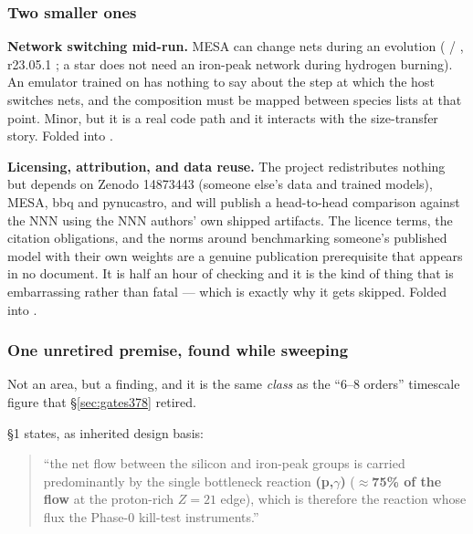 \subsubsection{Two smaller ones}
\label{sec:twosmaller}

\textbf{Network switching mid-run.} MESA can change nets during an evolution
(  / , r23.05.1
; a star does not need an iron-peak network during
hydrogen burning). An emulator trained on  has nothing to say about the
step at which the host switches nets, and the composition must be mapped between
species lists at that point. Minor, but it is a real code path and it interacts
with the size-transfer story. Folded into .

\textbf{Licensing, attribution, and data reuse.} The project redistributes
nothing but depends on Zenodo 14873443 (someone else's data and trained models),
MESA, bbq and pynucastro, and will publish a head-to-head comparison against the
NNN using the NNN authors' own shipped artifacts. The licence terms, the citation
obligations, and the norms around benchmarking someone's published model with
their own weights are a genuine publication prerequisite that appears in no
document. It is half an hour of checking and it is the kind of thing that is
embarrassing rather than fatal --- which is exactly why it gets skipped. Folded
into .

\subsubsection{One unretired premise, found while sweeping}
\label{sec:unretired}

Not an area, but a finding, and it is the same \emph{class} as the ``6--8
orders'' timescale figure that \S\ref{sec:gates378} retired.

 \S 1 states, as inherited
design basis:

\begin{quote}
``the net flow between the silicon and iron-peak groups is carried predominantly
by the single bottleneck reaction \textbf{(p,$\gamma$)}
(\textbf{$\approx$75\% of the flow} at the proton-rich $Z = 21$ edge), which is
therefore the reaction whose flux the Phase-0 kill-test instruments.''
\end{quote}

